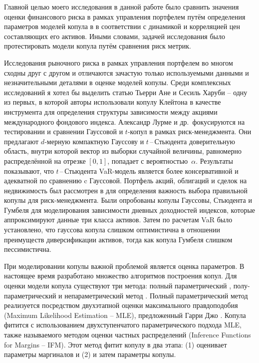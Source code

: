 Главной целью моего исследования в данной работе было сравнить значения оценки финансового риска в рамках управления портфелем путём определения параметров моделей копула в в соответствии с динамикой и корреляцией цен составляющих его активов. 
Иными словами, задачей исследования было протестировать модели копула путём сравнения риск метрик.

Исследования \cite{Ane2003, Kole2007, Lourme2016, Xu2008} рыночного риска в рамках управления портфелем во многом сходны друг с другом и отличаются зачастую только используемыми данными и незначительными деталями в оценке моделей копулы. 
Среди комплексных исследований я хотел бы выделить статью Тьерри Ане и Сесиль Харуби \cite{Ane2003} – одну из первых, в которой авторы использовали копулу Клейтона в качестве инструмента для определения структуры зависимости между акциями международного фондового индекса.
Александр Лурме и др.\,\cite{Lourme2016} фокусируются на тестировании и сравнении Гауссовой и $t$-копул в рамках риск-менеджмента. 
Они предлагают $d$-мерную компактную Гауссову и $t$\,--\,Стьюдента  доверительную область, внутри которой вектор из выборки случайной величины, равномерно распределённой на отрезке $[0, 1]$, попадает с вероятностью~$\alpha$.
Результаты показывают, что $t$\,--\,Стьюдента VaR-модель является более консервативной и адекватной по сравнению c Гауссовой.
Портфель акций, облигаций и сделок на недвижимость был рассмотрен в \cite{Kole2007} для определения важность выбора правильной копулы для риск-менеджмента. 
Были опробованы копулы Гауссовы, Стьюдента и Гумбеля для моделирования зависимости дневных доходностей индексов, которые аппроксимируют данные три класса активов. 
Затем по расчетам VaR было установлено, что гауссова копула слишком оптимистична в отношении преимуществ диверсификации активов, тогда как копула Гумбеля слишком пессимистична.

При моделировании копулы важной проблемой является оценка параметров. 
В настоящее время разработано множество алгоритмов построения копул. 
Для оценки модели копула существуют три метода: полный параметрический \cite{Patton2006}, полу-параметрический \cite {Chen2006, Lourme2016} и непараметрический метод \cite{Fermanian2003, Kim2007}. 
Полный параметрический метод реализуется посредством двухэтапной оценки максимального правдоподобия (Maximum Likelihood Estimation -- MLE), предложенный Гарри Джо \cite{Joe1997, Joe2014}.
Копула фитится с использованием двухступенчатого параметрического подхода MLE, также называемого методом оценки частных распределений (Inference Functions for Margins -- IFM). 
Этот метод фитит копулу в два этапа: (1) оценивает параметры маргиналов и (2) и затем параметры копулы.

